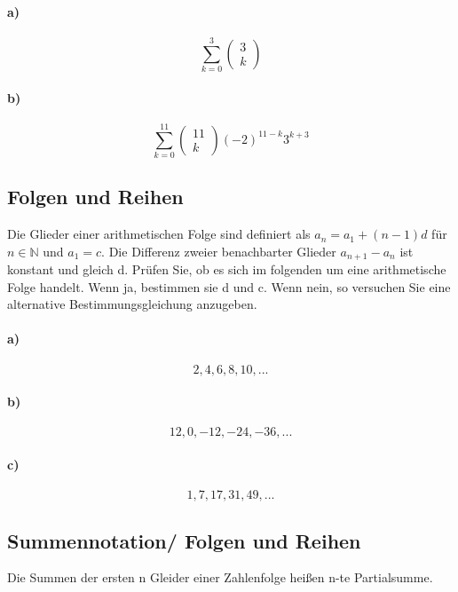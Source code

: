 \documentclass[paper=a4, fontsize=11pt]{scrartcl}
\numberwithin{equation}{section}
\numberwithin{figure}{section}
\numberwithin{table}{section}
\begin{document}
\paragraph{a)}
$$\sum^{3}_{k=0} \left(\begin{array}{c} 3 \\ k \end{array}\right)$$

\paragraph{b)}
$$\sum^{11}_{k=0} \left(\begin{array}{c} 11 \\ k \end{array}\right) (-2)^{11-k} 3^{k+3}$$

\subsection{Folgen und Reihen}
Die Glieder einer arithmetischen Folge sind definiert als $a_{n}=a_{1}+(n-1)d$ für $n \in \mathbb{N}$ und $a_{1}=c$. Die Differenz zweier benachbarter Glieder $a_{n+1}-a_{n}$ ist konstant und gleich d. Prüfen Sie, ob es sich im folgenden um eine arithmetische Folge handelt. Wenn ja, bestimmen sie d und c. Wenn nein, so versuchen Sie eine alternative Bestimmungsgleichung anzugeben.
\paragraph{a)}
$$2,4,6,8,10,...$$

\paragraph{b)}
$$12,0,-12,-24,-36,...$$

\paragraph{c)}
$$1,7,17,31,49,...$$

\subsection{Summennotation/ Folgen und Reihen}
Die Summen der ersten n Gleider einer Zahlenfolge heißen n-te Partialsumme.
\end{document}
